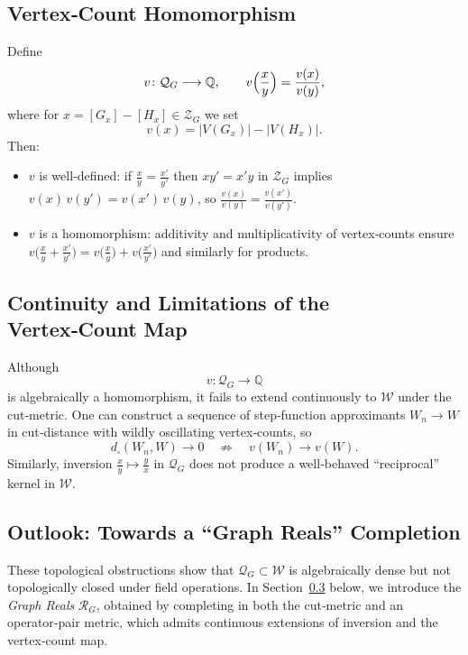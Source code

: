 \documentclass[11pt]{article}
\theoremstyle{definition}
\theoremstyle{plain}
\theoremstyle{remark}
\begin{document}
\subsection{Vertex‑Count Homomorphism}
Define
\[
  v\colon\mathcal{Q}_G\longrightarrow\mathbb{Q},
  \qquad
  v\Bigl(\frac{x}{y}\Bigr)=\frac{v(x)}{v(y)},
\]
where for \(x=[G_x]-[H_x]\in\mathcal{Z}_G\) we set
\[
  v(x)=\bigl|V(G_x)\bigr| - \bigl|V(H_x)\bigr|.
\]
Then:
\begin{itemize}
  \item \(v\) is well‑defined: if \(\tfrac{x}{y}=\tfrac{x'}{y'}\) then
        \(xy'=x'y\) in \(\mathcal Z_G\) implies
        \(v(x)\,v(y')=v(x')\,v(y)\), so
        \(\tfrac{v(x)}{v(y)}=\tfrac{v(x')}{v(y')}\).
  \item \(v\) is a homomorphism: additivity and multiplicativity of
        vertex‐counts ensure
        \(v\bigl(\tfrac{x}{y}+\tfrac{x'}{y'}\bigr)
         =v\bigl(\tfrac{x}{y}\bigr)
         +v\bigl(\tfrac{x'}{y'}\bigr)\)
        and similarly for products.
\end{itemize}

\subsection{Continuity and Limitations of the Vertex‑Count Map}

Although 
\[
  v\colon\mathcal{Q}_G\to\mathbb{Q}
\]
is algebraically a homomorphism, it fails to extend continuously to
\(\mathcal{W}\) under the cut‑metric.  One can construct a sequence of
step‑function approximants \(W_n\to W\) in cut‑distance with wildly
oscillating vertex‑counts, so
\[
  d_{\square}(W_n,W)\to0
  \quad\not\Longrightarrow\quad
  v(W_n)\to v(W).
\]
Similarly, inversion 
\(\tfrac{x}{y}\mapsto\tfrac{y}{x}\) in \(\mathcal{Q}_G\) does not
produce a well‑behaved “reciprocal” kernel in \(\mathcal W\).

\subsection{Outlook: Towards a “Graph Reals” Completion}
\label{sec:graph-reals}

These topological obstructions show that \(\mathcal{Q}_G\subset\mathcal{W}\)
is algebraically dense but not topologically closed under field
operations.  In Section~\ref{sec:graph-reals} below, we introduce the
\emph{Graph Reals} \(\mathcal{R}_G\), obtained by completing in both
the cut‑metric and an operator‑pair metric, which admits continuous
extensions of inversion and the vertex‑count map.
\end{document}
